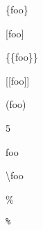 
\def\mytitle{Special Characters}


\{foo\}

[foo]

\{\{foo\}\}

[[foo]]

(foo)

5

\textbar{}foo\textbar{}

\textbackslash{}foo

\%

\texttt{\%}



